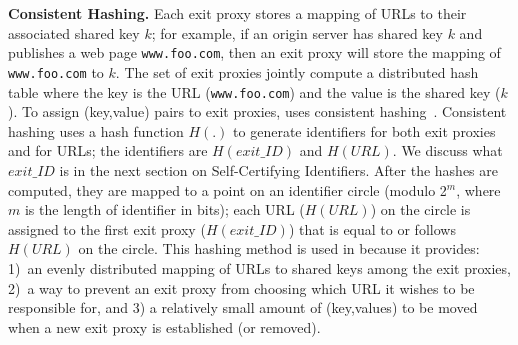\textbf{Consistent Hashing.}
Each exit proxy stores a mapping of URLs to their associated shared key $k$; for example, if 
an origin server has shared key $k$ and publishes a web page {\tt www.foo.com}, then an exit 
proxy will store the mapping of {\tt www.foo.com} to $k$.  The set of exit proxies jointly compute a distributed hash table where the key is the URL ({\tt www.foo.com}) and the value is the 
shared key ($k$).  To assign (key,value) pairs to exit proxies, \system{} uses consistent 
hashing~\cite{karger1997consistent,lewin1998consistent}.  Consistent hashing uses a hash function $H(.)$
to generate identifiers for both exit proxies and for URLs; the identifiers are $H(exit\_ID)$ and $H(URL)$. 
We discuss what $exit\_ID$ is in the next section on Self-Certifying Identifiers.  After the hashes are 
computed, they are mapped to a point on an identifier circle (modulo 2$^{m}$, where $m$ is the length of 
identifier in bits); each URL ($H(URL)$) on the circle is assigned to the first exit proxy ($H(exit\_ID)$) that 
is equal to or follows $H(URL)$ on the circle.  This hashing method is used in \system{} because it provides: 
1)~an evenly distributed mapping of URLs to shared keys among the exit proxies,
2)~a way to prevent an exit 
proxy from choosing which URL it wishes to be responsible for, and 3) a relatively small amount 
of (key,values) to be moved when a new exit proxy is established (or removed).  

